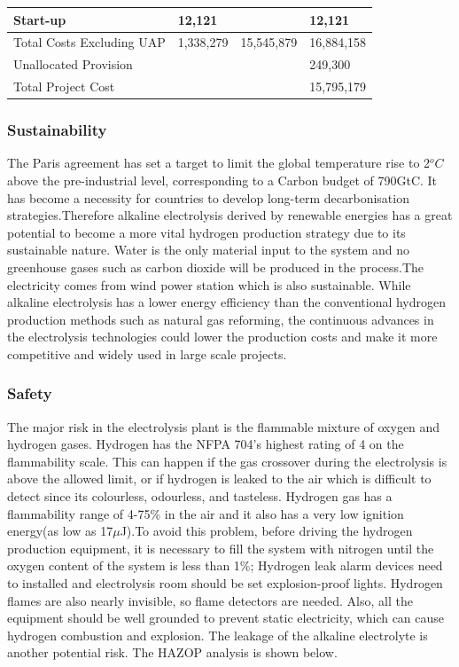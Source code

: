 \begin{singlespace}
\begin{longtable}{ |p{5.5cm}|p{2.5cm}|p{2.5cm}|p{2.9cm}|}
 \hline
 
 
 Start-up & 12,121 & & 12,121\\
 \hline
\rowcolor{burntsienna}
 Total Costs Excluding UAP &  1,338,279 & 15,545,879 & 16,884,158\\
 \hline
 
Unallocated Provision  & & & 249,300\\
\hline
\rowcolor{burntsienna}
Total Project Cost & & & 15,795,179\\
\hline
\end{longtable}
\end{singlespace}

\subsubsection{Sustainability}
The Paris agreement has set a target to limit the global temperature rise to 2$^oC$ above the pre-industrial level, corresponding to a
Carbon budget of 790GtC. It has become a necessity for countries to develop long-term decarbonisation strategies.Therefore alkaline electrolysis derived by renewable energies has a great potential to become a more vital hydrogen production strategy due to its sustainable nature. Water is the only material input to the system and no greenhouse gases such as carbon dioxide will be produced in the process.The electricity comes from wind power station which is also sustainable. While alkaline electrolysis has a lower energy efficiency than the conventional hydrogen production methods such as natural gas reforming, the continuous advances in the electrolysis technologies could lower the production costs and make it more competitive and widely used in large scale projects.
\subsubsection{Safety}
The major risk in the electrolysis plant is the flammable mixture of oxygen and hydrogen gases.
Hydrogen has the NFPA 704's highest rating of 4 on the flammability scale. \cite{safety} This can happen if the gas crossover during the electrolysis is above the allowed limit, or if hydrogen is leaked to the air which is difficult to detect since its colourless, odourless, and tasteless. Hydrogen gas has a flammability range of 4-75\% in the air and it also has a very low ignition energy(as low as 17$\mu$J).To avoid this problem, 
before driving the hydrogen production equipment, it is necessary to fill the system with nitrogen until the oxygen content of the system is less than 1\%; Hydrogen leak alarm devices need to installed and electrolysis room should be set explosion-proof lights. Hydrogen flames are also nearly invisible, so flame detectors are needed. Also, all the equipment should be well grounded to prevent static electricity, which can cause hydrogen combustion and explosion. The leakage of the alkaline electrolyte is another potential risk. The HAZOP analysis is shown below.


